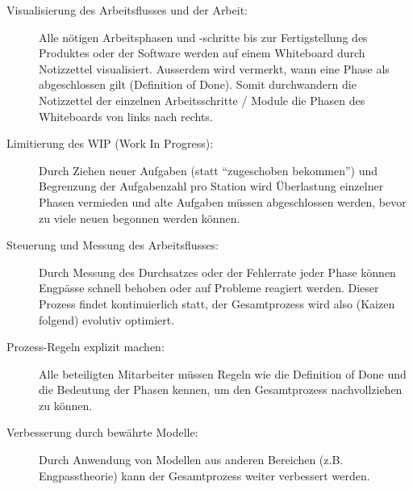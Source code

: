 \documentclass{scrartcl}
\begin{document}
\begin{description}
  \item[Visualisierung des Arbeitsflusses und der Arbeit:] Alle nötigen Arbeitsphasen und -schritte bis zur Fertigstellung des Produktes oder der Software werden auf einem Whiteboard durch Notizzettel visualisiert. Ausserdem wird vermerkt, wann eine Phase als abgeschlossen gilt (Definition of Done). Somit durchwandern die Notizzettel der einzelnen Arbeitsschritte / Module die Phasen des Whiteboards von links nach rechts.
  \item[Limitierung des WIP (Work In Progress):] Durch Ziehen neuer Aufgaben (statt ``zugeschoben bekommen'') und Begrenzung der Aufgabenzahl pro Station wird Überlastung einzelner Phasen vermieden und alte Aufgaben müssen abgeschlossen werden, bevor zu viele neuen begonnen werden können.
  \item[Steuerung und Messung des Arbeitsflusses:] Durch Messung des Durchsatzes oder der Fehlerrate jeder Phase können Engpässe schnell behoben oder auf Probleme reagiert werden. Dieser Prozess findet kontinuierlich statt, der Gesamtprozess wird also (Kaizen folgend) evolutiv optimiert.
  \item[Prozess-Regeln explizit machen:] Alle beteiligten Mitarbeiter müssen Regeln wie die Definition of Done und die Bedeutung der Phasen kennen, um den Gesamtprozess nachvollziehen zu können.
  \item[Verbesserung durch bewährte Modelle:] Durch Anwendung von Modellen aus anderen Bereichen (z.B. Engpasstheorie) kann der Gesamtprozess weiter verbessert werden.
\end{description}
\end{document}
